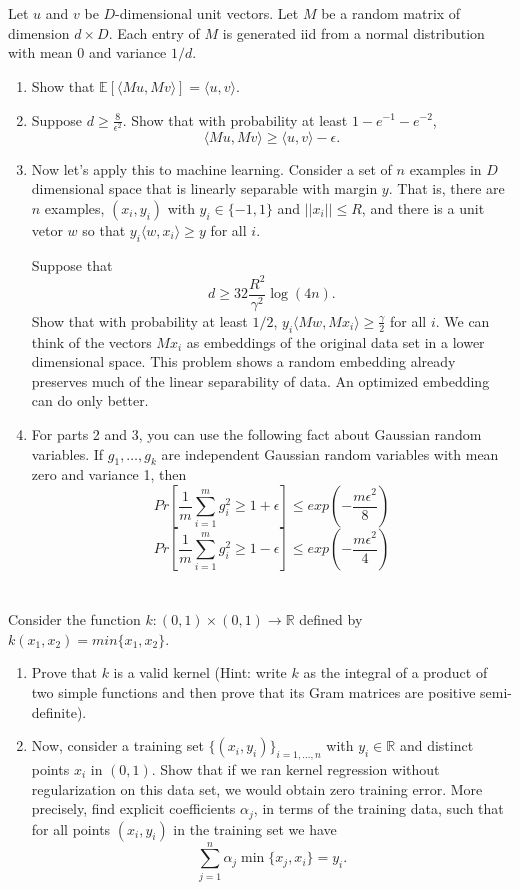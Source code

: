 \documentclass[a4paper]{article}
\begin{document}
\section{}
Let $u$ and $v$ be $D$-dimensional unit vectors. Let $M$ be a random matrix of dimension $d \times D$.
Each entry of $M$ is generated iid from a normal distribution with mean 0 and variance $1/d$.
\begin{enumerate}
    \item Show that $\mathbb{E}[\langle M u, M v\rangle ] = \langle u, v\rangle$.
    \item Suppose $d \geq \frac{8}{\epsilon^2}$. Show that with probability at least $1 - e^{-1} - e^{-2}$,
        $$\langle M u, M v \rangle  \geq \langle u, v \rangle  - \epsilon.$$
    \item Now let’s apply this to machine learning. Consider a set of $n$ examples in $D$ dimensional space that is linearly separable with margin $y$.
        That is, there are $n$ examples, $(x_i , y_i )$ with $y_i \in \{-1, 1\}$ and $||x_i || \leq R$, and there is a unit vetor $w$ so that $y_i \langle w, x_i  \rangle  \geq y$ for all $i$.

        Suppose that $$d \geq 32 \frac{R^2}{\gamma^2}\log(4n).$$
        Show that with probability at least $1/2$, $y_i \langle M w, M x_i  \rangle  \geq \frac{\gamma}{2}$ for all $i$.
        We can think of the vectors $M x_i$ as embeddings of the original data set in a lower dimensional space.
        This problem shows a random embedding already preserves much of the linear separability of data.
        An optimized embedding can do only better.
    \item For parts 2 and 3, you can use the following fact about Gaussian random variables.
        If $g_1 , \dots, g_k$ are independent Gaussian random variables with mean zero and variance 1, then
        $$Pr\left[\frac{1}{m}\sum_{i=1}^m g_i^2 \geq 1 + \epsilon\right] \leq exp\left( -\frac{m\epsilon^2}{8}\right)$$
        $$Pr\left[\frac{1}{m}\sum_{i=1}^m g_i^2 \geq 1 - \epsilon\right] \leq exp\left( -\frac{m\epsilon^2}{4}\right)$$
\end{enumerate}

\section{}
Consider the function $k : (0, 1) \times (0, 1) \rightarrow \mathbb{R}$ defined by $k(x_1 , x_2 ) = min\{x_1 , x_2\}$.
\begin{enumerate}
    \item Prove that $k$ is a valid kernel (Hint: write $k$ as the integral of a product of two simple functions and then prove that its Gram matrices are positive semi-definite).
    \item Now, consider a training set $\{(x_i , y_i )\}_{i=1,\dots,n}$ with $y_i \in \mathbb{R}$ and distinct points $x_i$ in $(0, 1)$.
        Show that if we ran kernel regression without regularization on this data set, we would obtain zero training error.
More precisely, find explicit coefficients $\alpha_j$, in terms of the training data, such that for all points $(x_i , y_i)$ in the training set we have
$$\sum_{j=1}^n \alpha_j \min\{x_j , x_i \} = y_i .$$
\end{enumerate}
\end{document}
